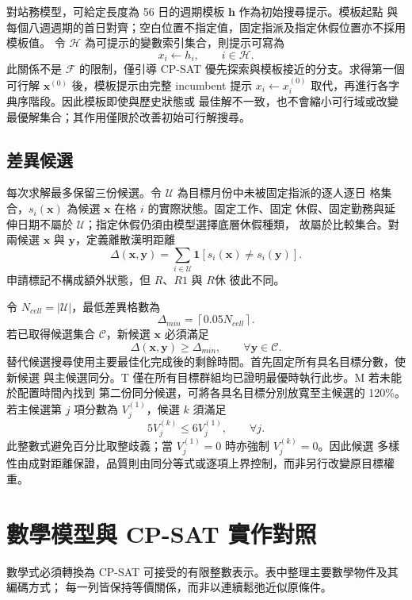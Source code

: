 \documentclass[a4paper,12pt]{article}
\begin{document}
對站務模型，可給定長度為 56 日的週期模板 \(\mathbf h\) 作為初始搜尋提示。模板起點
與每個八週週期的首日對齊；空白位置不指定值，固定指派及指定休假位置亦不採用模板值。
令 \(\mathcal H\) 為可提示的變數索引集合，則提示可寫為
\[
  x_i\leftarrow h_i,
  \qquad i\in\mathcal H.
\]
此關係不是 \(\mathcal F\) 的限制，僅引導 CP-SAT 優先探索與模板接近的分支。求得第一個
可行解 \(\mathbf x^{(0)}\) 後，模板提示由完整 incumbent 提示
\(x_i\leftarrow x_i^{(0)}\) 取代，再進行各字典序階段。因此模板即使與歷史狀態或
最佳解不一致，也不會縮小可行域或改變最優解集合；其作用僅限於改善初始可行解搜尋。

\subsection{差異候選}

每次求解最多保留三份候選。令 \(\mathcal U\) 為目標月份中未被固定指派的逐人逐日
格集合，\(s_i(\mathbf x)\) 為候選 \(\mathbf x\) 在格 \(i\) 的實際狀態。固定工作、固定
休假、固定勤務與延伸日期不屬於 \(\mathcal U\)；指定休假仍須由模型選擇底層休假種類，
故屬於比較集合。對兩候選 \(\mathbf x\) 與 \(\mathbf y\)，定義離散漢明距離
\[
  \Delta(\mathbf x,\mathbf y)
  =\sum_{i\in\mathcal U}\mathbf 1\!\left[s_i(\mathbf x)\neq s_i(\mathbf y)\right].
\]
申請標記不構成額外狀態，但 \(R\)、\(R1\) 與 \(R休\) 彼此不同。

令 \(N_{cell}=|\mathcal U|\)，最低差異格數為
\[
  \Delta_{min}=\left\lceil0.05N_{cell}\right\rceil.
\]
若已取得候選集合 \(\mathcal C\)，新候選 \(\mathbf x\) 必須滿足
\[
  \Delta(\mathbf x,\mathbf y)\geq\Delta_{min},
  \qquad \forall\mathbf y\in\mathcal C.
\]
替代候選搜尋使用主要最佳化完成後的剩餘時間。首先固定所有具名目標分數，使新候選
與主候選同分。T 僅在所有目標群組均已證明最優時執行此步。M 若未能於配置時間內找到
第二份同分候選，可將各具名目標分別放寬至主候選的 120\%。若主候選第 \(j\) 項分數為
\(V_j^{(1)}\)，候選 \(k\) 須滿足
\[
  5V_j^{(k)}\leq6V_j^{(1)},\qquad\forall j.
\]
此整數式避免百分比取整歧義；當 \(V_j^{(1)}=0\) 時亦強制 \(V_j^{(k)}=0\)。因此候選
多樣性由成對距離保證，品質則由同分等式或逐項上界控制，而非另行改變原目標權重。

\section{數學模型與 CP-SAT 實作對照}

數學式必須轉換為 CP-SAT 可接受的有限整數表示。表中整理主要數學物件及其編碼方式；
每一列皆保持等價關係，而非以連續鬆弛近似原條件。
\end{document}
